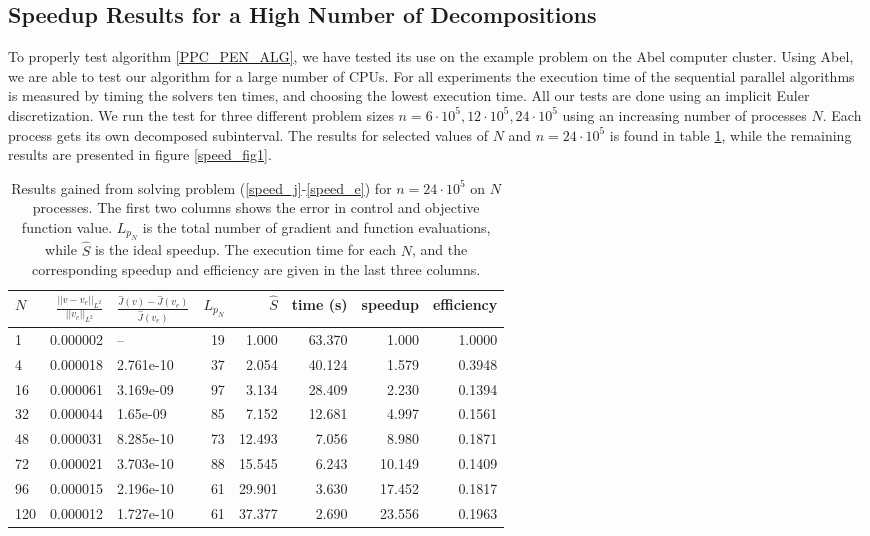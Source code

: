 \subsection{Speedup Results for a High Number of Decompositions} \label{Aspeed_sec}
To properly test algorithm \ref{PPC_PEN_ALG}, we have tested its use on the example problem on the Abel computer cluster. Using Abel, we are able to test our algorithm for a large number of CPUs. For all experiments the execution time of the sequential parallel algorithms is measured by timing the solvers ten times, and choosing the lowest execution time. All our tests are done using an implicit Euler discretization. We run the test for three different problem sizes $n=6\cdot 10^5,12\cdot 10^5,24\cdot 10^5$ using an increasing number of processes $N$. Each process gets its own decomposed subinterval. The results for selected values of $N$ and $n= 24\cdot 10^5$ is found in table \ref{speed1}, while the remaining results are presented in figure \ref{speed_fig1}.
\\
\begin{table}[h]
\centering
\caption{Results gained from solving problem (\ref{speed_j}-\ref{speed_e}) for $n=24\cdot 10^5$ on $N$ processes. The first two columns shows the error in control and objective function value. $L_{p_N}$ is the total number of gradient and function evaluations, while $\hat S$ is the ideal speedup. The execution time for each $N$, and the corresponding speedup and efficiency are given in the last three columns.}
\label{speed1}
\begin{tabular}{lrlrrrrr}
\toprule
{}$N$ &   $\frac{||v-v_e||_{L^2}}{||v_e||_{L^2}}$ &     $\frac{\hat J(v)-\hat J(v_e)}{\hat{J}(v_e)}$ &   $L_{p_N}$ &     $\hat S$ &       time (s) &    speedup &        efficiency \\
\midrule
1   &  0.000002 &           -- &  19 &   1.000 &  63.370 &   1.000 &  1.0000 \\
4   &  0.000018 &  2.761e-10 &  37 &   2.054 &  40.124 &   1.579 &  0.3948 \\
16  &  0.000061 &  3.169e-09 &  97 &   3.134 &  28.409 &   2.230 &  0.1394 \\
32  &  0.000044 &   1.65e-09 &  85 &   7.152 &  12.681 &   4.997 &  0.1561 \\
48  &  0.000031 &  8.285e-10 &  73 &  12.493 &   7.056 &   8.980 &  0.1871 \\
72  &  0.000021 &  3.703e-10 &  88 &  15.545 &   6.243 &  10.149 &  0.1409 \\
96  &  0.000015 &  2.196e-10 &  61 &  29.901 &   3.630 &  17.452 &  0.1817 \\
120 &  0.000012 &  1.727e-10 &  61 &  37.377 &   2.690 &  23.556 &  0.1963 \\
\bottomrule
\end{tabular}
\end{table}
